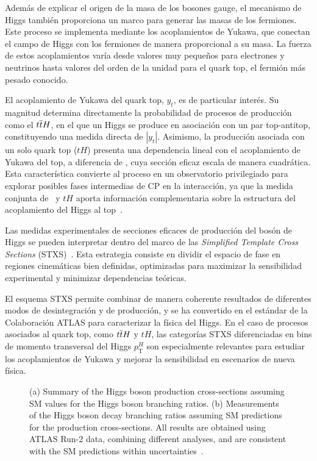 Además de explicar el origen de la masa de los bosones gauge, el mecanismo de Higgs también proporciona un marco para generar las masas de los fermiones. Este proceso se implementa mediante los acoplamientos de Yukawa, que conectan el campo de Higgs con los fermiones de manera proporcional a su masa. La fuerza de estos acoplamientos varía desde valores muy pequeños para electrones y neutrinos hasta valores del orden de la unidad para el quark top, el fermión más pesado conocido.  

El acoplamiento de Yukawa del quark top, \(y_{t}\), es de particular interés. Su magnitud determina directamente la probabilidad de procesos de producción como el \(t\overline{t}H\), en el que un Higgs se produce en asociación con un par top-antitop, constituyendo una medida directa de \(|y_{t}|\). Asimismo, la producción asociada con un solo quark top (\(tH\)) presenta una dependencia lineal con el acoplamiento de Yukawa del top, a diferencia de \ttH, cuya sección eficaz escala de manera cuadrática. Esta característica convierte al proceso en un observatorio privilegiado para explorar posibles fases intermedias de CP en la interacción, ya que la medida conjunta de \ttH\ y \(tH\) aporta información complementaria sobre la estructura del acoplamiento del Higgs al top~\cite{Bernreuther:2002uj,Brod:2013cka}. 

Las medidas experimentales de secciones eficaces de producción del bosón de Higgs se pueden interpretar dentro del marco de las \textit{Simplified Template Cross Sections} (STXS)~\cite{badger2016leshouches2015physics,STXS11}. Esta estrategia consiste en dividir el espacio de fase en regiones cinemáticas bien definidas, optimizadas para maximizar la sensibilidad experimental y minimizar dependencias teóricas.  

El esquema STXS permite combinar de manera coherente resultados de diferentes modos de desintegración y de producción, y se ha convertido en el estándar de la Colaboración ATLAS para caracterizar la física del Higgs. En el caso de procesos asociados al quark top, como \(t\overline{t}H\) y \(tH\), las categorías STXS diferenciadas en bins de momento transversal del Higgs \(p_{\text{T}}^{H}\) son especialmente relevantes para estudiar los acoplamientos de Yukawa y mejorar la sensibilidad en escenarios de nueva física.  

\begin{figure}[htbp]
  \centering
  \hfill
  \caption{(a) Summary of the Higgs boson production cross-sections assuming SM values for the Higgs boson branching ratios. 
  (b) Measurements of the Higgs boson decay branching ratios assuming SM predictions for the production cross-sections. 
  All results are obtained using ATLAS Run-2 data, combining different analyses, and are consistent with the SM predictions within uncertainties~\cite{Nature_ATLAS}.}
  \label{res:higgs_mu}
\end{figure}


